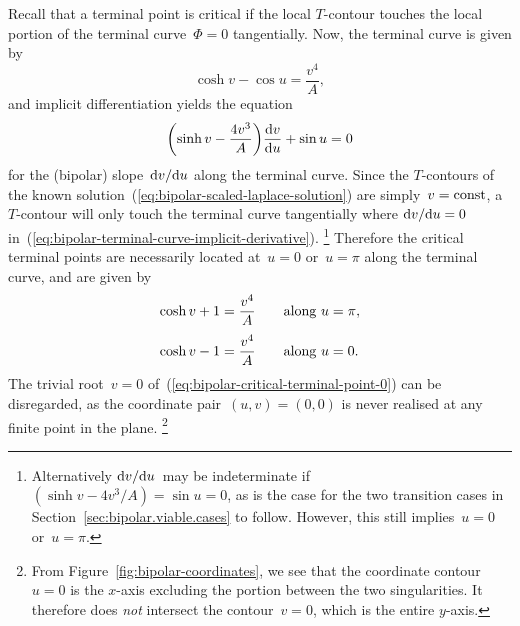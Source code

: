 Recall that a terminal point is critical
if the local $T$-contour touches
the local portion of the terminal curve~$\Phi = 0$ tangentially.
Now, the terminal curve is given by
\begin{equation}
  \cosh v - \cos u = \frac{v^4}{A},
  \label{eq:bipolar-terminal-curve}
\end{equation}
and implicit differentiation yields the equation
\begin{equation}
  \roundbr*{\sinh v - \frac{4 v^3}{A}} \tder{v}{u} + \sin u = 0
  \label{eq:bipolar-terminal-curve-implicit-derivative}
\end{equation}
for the (bipolar) slope~$\mathop{}\!\mathrm{d} v / {\mathop{}\!\mathrm{d} u}$
along the terminal curve.
Since the $T$-contours
of the known solution~(\ref{eq:bipolar-scaled-laplace-solution})
are simply~$v = \mathrm{const}$,
a $T$-contour will only touch the terminal curve tangentially
where $\mathop{}\!\mathrm{d} v / {\mathop{}\!\mathrm{d} u} = 0$
in~(\ref{eq:bipolar-terminal-curve-implicit-derivative}).%
\footnote{
  Alternatively $\mathop{}\!\mathrm{d} v / {\mathop{}\!\mathrm{d} u}$~may be indeterminate
  if~$(\sinh v - 4 v^3 / A) = \sin u = 0$,
  as is the case for the two transition cases
  in Section~\ref{sec:bipolar.viable.cases} to follow.
  However, this still implies~$u = 0$ or~$u = \pi$.
}
Therefore the critical terminal points are necessarily located
at~$u = 0$ or~$u = \pi$ along the terminal curve,
and are given by
\begin{align}
  \cosh v + 1 &= \frac{v^4}{A} \eqnspace \text{along~$u = \pi$},
  \label{eq:bipolar-critical-terminal-point-pi}
    \\[\tallspace]
  \cosh v - 1 &= \frac{v^4}{A} \eqnspace \text{along~$u = 0$}.
  \label{eq:bipolar-critical-terminal-point-0}
\end{align}
The trivial root~$v = 0$
of~(\ref{eq:bipolar-critical-terminal-point-0})
can be disregarded,
as the coordinate pair~$(u, v) = (0, 0)$
is never realised at any finite point in the plane.%
\footnote{
  From Figure~\ref{fig:bipolar-coordinates},
  we see that the coordinate contour~$u = 0$
  is the $x$-axis excluding the portion between the two singularities.
  It therefore does \emph{not} intersect the contour~$v = 0$,
  which is the entire $y$-axis.
}

